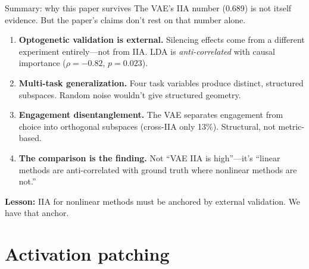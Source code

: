 \documentclass[aspectratio=169,11pt]{beamer}
\begin{document}
\begin{frame}{Summary: why this paper survives}
\vspace{-0.3em}
The VAE's IIA number (0.689) is not itself evidence. But the paper's claims don't rest on that number alone.
\vspace{0.3em}
\begin{enumerate}
  \item \textbf{Optogenetic validation is external.} Silencing effects come from a different experiment entirely---not from IIA. LDA is \emph{anti-correlated} with causal importance ($\rho = -0.82$, $p = 0.023$).
  \item \textbf{Multi-task generalization.} Four task variables produce distinct, structured subspaces. Random noise wouldn't give structured geometry.
  \item \textbf{Engagement disentanglement.} The VAE separates engagement from choice into orthogonal subspaces (cross-IIA only 13\%). Structural, not metric-based.
  \item \textbf{The comparison is the finding.} Not ``VAE IIA is high''---it's ``linear methods are anti-correlated with ground truth where nonlinear methods are not.''
\end{enumerate}
\vspace{0.3em}
\textbf{Lesson:} IIA for nonlinear methods must be anchored by external validation. We have that anchor.
\end{frame}


\begin{frame}[plain]
\vfill
\begin{center}
  \setlength{\fboxrule}{2.5pt}%
\end{center}
\vfill
\end{frame}

\section{Activation patching}
\end{document}
